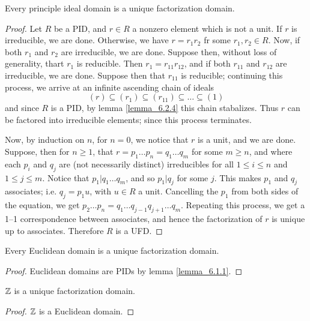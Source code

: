 \begin{theorem}\label{lemma_6.3.5}
  Every principle ideal domain is a unique factorization domain.
\end{theorem}
\begin{proof}
  Let $R$ be a PID, and  $r \in R$ a nonzero element which is not a unit. If
  $r$ is irreducible, we are done. Otherwise, we have  $r=r_1r_2$ fr some
  $r_1,r_2 \in R$. Now, if both $r_1$ and $r_2$ are irreducible, we are done.
  Suppose then, without loss of generality, thart $r_1$ is reducible. Then
  $r_1=r_{11}r_{12}$, and if both $r_{11}$ and $r_{12}$ are irreducible, we
  are done. Suppose then that $r_{11}$ is reducible; continuing this process,
  we arrive at an infinite ascending chain of ideals
  \begin{equation*}
    (r) \subseteq (r_1) \subseteq (r_{11}) \subseteq \dots \subseteq (1)
  \end{equation*}
  and since $R$ is a PID, by lemma \ref{lemma_6.2.4} this chain stabalizes. Thus
  $r$ can be factored into irreducible elements; since this process terminates.

  Now, by induction on $n$, for  $n=0$, we notice that  $r$ is a unit, and we
  are done. Suppose, then for  $n \geq 1$, that  $r=p_1 \dots p_n=q_1 \dots
  q_m$ for some $m \geq n$, and where each  $p_i$ and  $q_j$ are  (not
  necessarily distinct) irreducibles for all $1 \leq i \leq n$ and $1 \leq j
  \leq m$. Notice that  $p_1|q_1 \dots q_m$, and so $p_1|q_j$ for some $j$.
  This makes  $p_1$ and $q_j$ associates; i.e.  $q_j=p_1u$, with $u \in R$ a
  unit. Cancelling the  $p_1$ from both sides of the equation, we get $p_2
  \dots p_n=q_1 \dots q_{j-1}q_{j+1} \dots q_m$. Repeating this process, we
  get a 1--1 correspondence between associates, and hence the factorization of
  $r$ is unique up to associates. Therefore  $R$ is a UFD.
\end{proof}
\begin{corollary}
  Every Euclidean domain is a unique factorization domain.
\end{corollary}
\begin{proof}
  Euclidean domains are PIDs by lemma \ref{lemma_6.1.1}.
\end{proof}
\begin{corollary}
  $\mathbb{Z}$ is a unique factorization domain.
\end{corollary}
\begin{proof}
  $\mathbb{Z}$ is a Euclidean domain.
\end{proof}
